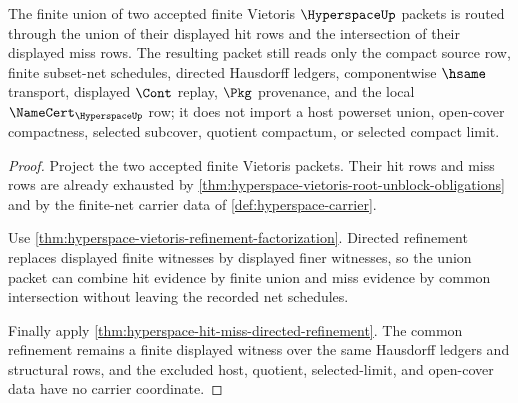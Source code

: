 \begin{theorem}
\label{thm:hyperspace-vietoris-union-stability}
The finite union of two accepted finite Vietoris $\HyperspaceUp$ packets is routed through the union of their displayed hit rows and the intersection of their displayed miss rows. The resulting packet still reads only the compact source row, finite subset-net schedules, directed Hausdorff ledgers, componentwise $\hsame$ transport, displayed $\Cont$ replay, $\Pkg$ provenance, and the local $\NameCert_{\HyperspaceUp}$ row; it does not import a host powerset union, open-cover compactness, selected subcover, quotient compactum, or selected compact limit.
\end{theorem}
\begin{proof}
Project the two accepted finite Vietoris packets. Their hit rows and miss rows are already exhausted by \autoref{thm:hyperspace-vietoris-root-unblock-obligations} and by the finite-net carrier data of \autoref{def:hyperspace-carrier}.

Use \autoref{thm:hyperspace-vietoris-refinement-factorization}. Directed refinement replaces displayed finite witnesses by displayed finer witnesses, so the union packet can combine hit evidence by finite union and miss evidence by common intersection without leaving the recorded net schedules.

Finally apply \autoref{thm:hyperspace-hit-miss-directed-refinement}. The common refinement remains a finite displayed witness over the same Hausdorff ledgers and structural rows, and the excluded host, quotient, selected-limit, and open-cover data have no carrier coordinate.
\end{proof}




